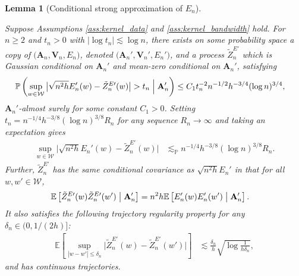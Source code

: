 \documentclass[11pt,lof]{puthesis}
\renewcommand{\P}{\ensuremath{\mathbb{P}}}
\newcommand{\E}{\ensuremath{\mathbb{E}}}
\newcommand{\bA}{\ensuremath{\mathbf{A}}}
\newcommand{\bV}{\ensuremath{\mathbf{V}}}
\newcommand{\cW}{\ensuremath{\mathcal{W}}}
\theoremstyle{break}
\newtheorem{lemma}{Lemma}[section]
\theoremstyle{proof}
\begin{document}
\begin{lemma}[Conditional strong approximation of $E_n$]
  \label{lem:kernel_app_conditional_strong_approx_En}

  Suppose Assumptions
  \ref{ass:kernel_data} and \ref{ass:kernel_bandwidth} hold.
  For $n \geq 2$
  and $t_n > 0$ with $\left|\log t_n\right| \lesssim \log n$,
  there exists on some probability space
  a copy of
  $\big(\bA_n, \bV_n, E_n\big)$,
  denoted
  $\big(\bA_n', \bV_n', E_n'\big)$,
  and a process
  $\tilde Z^{E\prime}_n$
  which is Gaussian conditional on $\bA_n'$
  and mean-zero conditional on $\bA_n'$,
  satisfying
  \begin{align*}
    \P\left(
      \sup_{w \in \cW}
      \big|
      \sqrt{n^2h} E_n'(w) - \tilde Z_n^{E\prime}(w)
      \big|
      > t_n
      \Bigm\vert \bA_n'
    \right)
    &\leq
    C_1
    t_n^{-2}
    n^{-1/2}
    h^{-3/4}
    (\log n)^{3/4},
  \end{align*}
  $\bA_n'$-almost surely
  for some constant $C_1 > 0$.
  Setting $t_n = n^{-1/4} h^{-3/8} (\log n)^{3/8} R_n$
  for any sequence $R_n \to \infty$
  and taking an expectation gives
  \begin{align*}
    \sup_{w \in \cW}
    \big|
    \sqrt{n^2h} E_n'(w) - \tilde Z_n^{E\prime}(w)
    \big|
    &\lesssim_\P
    n^{-1/4}
    h^{-3/8} (\log n)^{3/8} R_n.
  \end{align*}
  Further,
  $\tilde Z_n^{E\prime}$ has the same conditional covariance as
  $\sqrt{n^2h} E_n'$ in that for all $w, w' \in \cW$,
  \begin{align*}
    \E\left[
      \tilde Z_n^{E\prime}(w)
      \tilde Z_n^{E\prime}(w')
      \bigm\vert \bA_n'
    \right]
    &=
    n^2h
    \E\left[
      E_n'(w)
      E_n'(w')
      \bigm\vert \bA_n'
    \right].
  \end{align*}
  It also satisfies the following
  trajectory regularity property
  for any $\delta_n \in (0, 1/(2h)]$:
  \begin{align*}
    \E\left[
      \sup_{|w-w'| \leq \delta_n}
      \big|
      \tilde Z_n^{E\prime}(w)
      - \tilde Z_n^{E\prime}(w')
      \big|
    \right]
    &\lesssim
    \frac{\delta_n}{h}
    \sqrt{\log \frac{1}{h\delta_n}},
  \end{align*}
  and has continuous trajectories.

\end{lemma}
\end{document}
